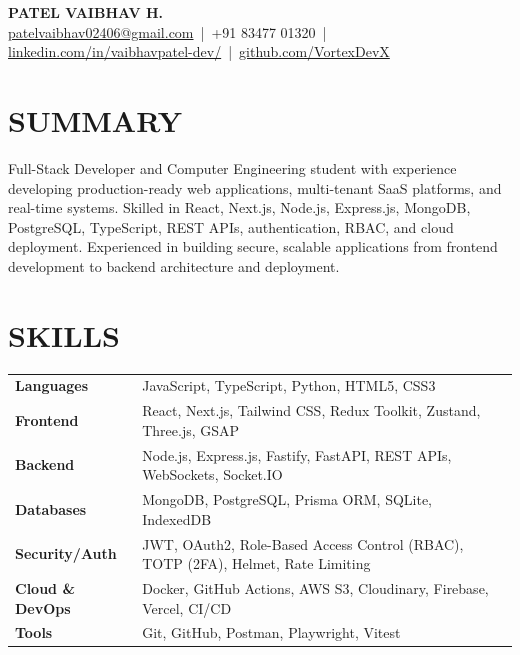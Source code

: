 \documentclass[letterpaper,11pt]{article}
\begin{document}
\begin{center}
    {\LARGE \textbf{PATEL VAIBHAV H.}} \\[6pt]
    \small
    \href{mailto:patelvaibhav02406@gmail.com}{patelvaibhav02406@gmail.com}
    \,|\,
    +91 83477 01320
    \,|\,
    \href{https://linkedin.com/in/vaibhavpatel-dev/}{linkedin.com/in/vaibhavpatel-dev/}
    \,|\,
    \href{https://github.com/VortexDevX}{github.com/VortexDevX}
\end{center}

\vspace{8pt}

\section{SUMMARY}
Full-Stack Developer and Computer Engineering student with experience developing production-ready web applications, multi-tenant SaaS platforms, and real-time systems. Skilled in React, Next.js, Node.js, Express.js, MongoDB, PostgreSQL, TypeScript, REST APIs, authentication, RBAC, and cloud deployment. Experienced in building secure, scalable applications from frontend development to backend architecture and deployment.

\vspace{4pt}

\section{SKILLS}
\small
\begin{tabularx}{\linewidth}{@{}l X@{}}
\textbf{Languages}       & JavaScript, TypeScript, Python, HTML5, CSS3 \\
\textbf{Frontend}        & React, Next.js, Tailwind CSS, Redux Toolkit, Zustand, Three.js, GSAP \\
\textbf{Backend}         & Node.js, Express.js, Fastify, FastAPI, REST APIs, WebSockets, Socket.IO \\
\textbf{Databases}       & MongoDB, PostgreSQL, Prisma ORM, SQLite, IndexedDB \\
\textbf{Security/Auth}   & JWT, OAuth2, Role-Based Access Control (RBAC), TOTP (2FA), Helmet, Rate Limiting \\
\textbf{Cloud \& DevOps}  & Docker, GitHub Actions, AWS S3, Cloudinary, Firebase, Vercel, CI/CD \\
\textbf{Tools}           & Git, GitHub, Postman, Playwright, Vitest \\
\end{tabularx}
\end{document}
